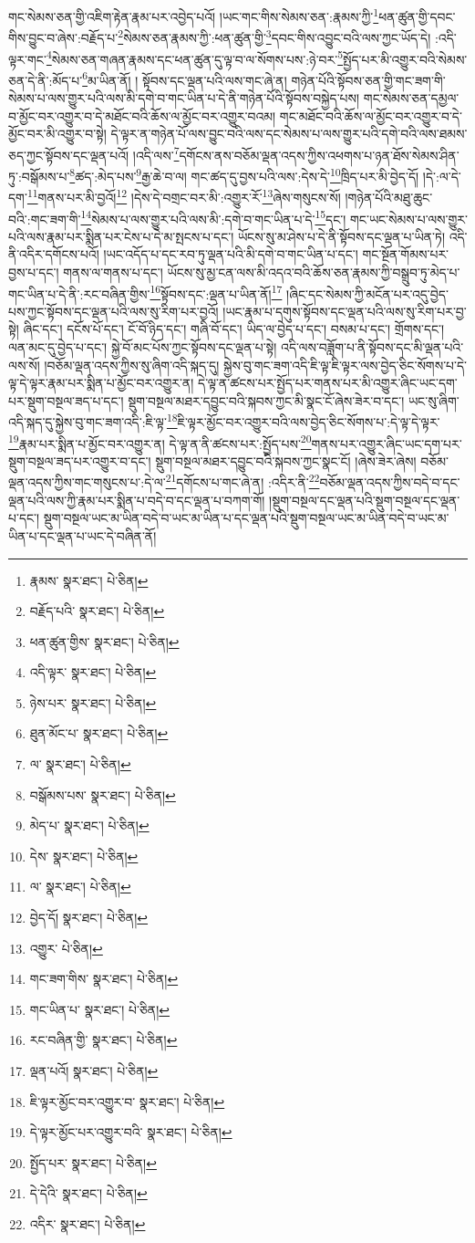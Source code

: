 གང་སེམས་ཅན་གྱི་འཇིག་རྟེན་རྣམ་པར་འབྱེད་པའོ། །ཡང་གང་གིས་སེམས་ཅན་:རྣམས་ཀྱི་\footnote{རྣམས་  སྣར་ཐང་།  པེ་ཅིན། }ཕན་ཚུན་གྱི་དབང་གིས་བྱུང་བ་ཞེས་:བརྗོད་པ་\footnote{བརྗོད་པའི་  སྣར་ཐང་།  པེ་ཅིན། }སེམས་ཅན་རྣམས་ཀྱི་:ཕན་ཚུན་གྱི་\footnote{ཕན་ཚུན་གྱིས་  སྣར་ཐང་།  པེ་ཅིན། }དབང་གིས་འབྱུང་བའི་ལས་ཀྱང་ཡོད་དེ། :འདི་ལྟར་གང་\footnote{འདི་ལྟར་  སྣར་ཐང་།  པེ་ཅིན། }སེམས་ཅན་གཞན་རྣམས་དང་ཕན་ཚུན་དུ་ལྟ་བ་ལ་སོགས་པས་:ཉེ་བར་\footnote{ཉེས་པར་  སྣར་ཐང་།  པེ་ཅིན། }སྤྱོད་པར་མི་འགྱུར་བའི་སེམས་ཅན་དེ་ནི་:མོད་པ་\footnote{ཐུན་མོང་པ་  སྣར་ཐང་།  པེ་ཅིན། }མ་ཡིན་ནོ། །
སྟོབས་དང་ལྡན་པའི་ལས་གང་ཞེ་ན། གཉེན་པོའི་སྟོབས་ཅན་གྱི་གང་ཟག་གི་སེམས་པ་ལས་གྱུར་པའི་ལས་མི་དགེ་བ་གང་ཡིན་པ་དེ་ནི་གཉེན་པོའི་སྟོབས་བསྐྱེད་པས། གང་སེམས་ཅན་དམྱལ་བ་མྱོང་བར་འགྱུར་བ་དེ་མཐོང་བའི་ཆོས་ལ་མྱོང་བར་འགྱུར་བའམ། གང་མཐོང་བའི་ཆོས་ལ་མྱོང་བར་འགྱུར་བ་དེ་མྱོང་བར་མི་འགྱུར་བ་སྟེ། དེ་ལྟར་ན་གཉེན་པོ་ལས་བྱུང་བའི་ལས་དང་སེམས་པ་ལས་གྱུར་པའི་དགེ་བའི་ལས་ཐམས་ཅད་ཀྱང་སྟོབས་དང་ལྡན་པའོ། །འདི་ལས་\footnote{ལ་  སྣར་ཐང་།  པེ་ཅིན། }དགོངས་ནས་བཅོམ་ལྡན་འདས་ཀྱིས་འཕགས་པ་ཉན་ཐོས་སེམས་ཤིན་ཏུ་:བསྒོམས་པ་\footnote{བསྒོམས་པས་  སྣར་ཐང་།  པེ་ཅིན། }ཚད་:མེད་པས་\footnote{མེད་པ་  སྣར་ཐང་།  པེ་ཅིན། }རྒྱ་ཆེ་བ་ལ། གང་ཚད་དུ་བྱས་པའི་ལས་:དེས་དེ་\footnote{དེས་  སྣར་ཐང་།  པེ་ཅིན། }ཁྲིད་པར་མི་བྱེད་དོ། །དེ་:ལ་དེ་དག་\footnote{ལ་  སྣར་ཐང་།  པེ་ཅིན། }གནས་པར་མི་བྱའོ།\footnote{བྱེད་དོ།  སྣར་ཐང་།  པེ་ཅིན། } །དེས་དེ་བགྲང་བར་མི་:འགྱུར་རོ་\footnote{འགྱུར་  པེ་ཅིན། }ཞེས་གསུངས་སོ། །གཉེན་པོའི་མཐུ་ཆུང་བའི་:གང་ཟག་གི་\footnote{གང་ཟག་གིས་  སྣར་ཐང་།  པེ་ཅིན། }སེམས་པ་ལས་གྱུར་པའི་ལས་མི་:དགེ་བ་གང་ཡིན་པ་དེ་\footnote{གང་ཡིན་པ་  སྣར་ཐང་།  པེ་ཅིན། }དང་། གང་ཡང་སེམས་པ་ལས་གྱུར་པའི་ལས་རྣམ་པར་སྨིན་པར་ངེས་པ་དེ་མ་སྤངས་པ་དང་། ཡོངས་སུ་མ་ཤེས་པ་དེ་ནི་སྟོབས་དང་ལྡན་པ་ཡིན་ཏེ། འདི་ནི་འདིར་དགོངས་པའོ། །ཡང་འདོད་པ་དང་རབ་ཏུ་ལྡན་པའི་མི་དགེ་བ་གང་ཡིན་པ་དང་། གང་སྔོན་གོམས་པར་བྱས་པ་དང་། གནས་ལ་གནས་པ་དང་། ཡོངས་སུ་མྱ་ངན་ལས་མི་འདའ་བའི་ཆོས་ཅན་རྣམས་ཀྱི་བསྒྲུབ་ཏུ་མེད་པ་གང་ཡིན་པ་དེ་ནི་:རང་བཞིན་གྱིས་\footnote{རང་བཞིན་གྱི་  སྣར་ཐང་།  པེ་ཅིན། }སྟོབས་དང་:ལྡན་པ་ཡིན་ནོ།\footnote{ལྡན་པའོ།  སྣར་ཐང་།  པེ་ཅིན། } །ཞིང་དང་སེམས་ཀྱི་མངོན་པར་འདུ་བྱེད་པས་ཀྱང་སྟོབས་དང་ལྡན་པའི་ལས་སུ་རིག་པར་བྱའོ། །ཡང་རྣམ་པ་དགུས་སྟོབས་དང་ལྡན་པའི་ལས་སུ་རིག་པར་བྱ་སྟེ། ཞིང་དང་། དངོས་པོ་དང་། ངོ་བོ་ཉིད་དང་། གཞི་བོ་དང་། ཡིད་ལ་བྱེད་པ་དང་། བསམ་པ་དང་། གྲོགས་དང་། ལན་མང་དུ་བྱེད་པ་དང་། སྐྱེ་བོ་མང་པོས་ཀྱང་སྟོབས་དང་ལྡན་པ་སྟེ། འདི་ལས་བཟློག་པ་ནི་སྟོབས་དང་མི་ལྡན་པའི་ལས་སོ། །བཅོམ་ལྡན་འདས་ཀྱིས་སུ་ཞིག་འདི་སྐད་དུ། སྐྱེས་བུ་གང་ཟག་འདི་ཇི་ལྟ་ཇི་ལྟར་ལས་བྱེད་ཅིང་སོགས་པ་དེ་ལྟ་དེ་ལྟར་རྣམ་པར་སྨིན་པ་མྱོང་བར་འགྱུར་ན། དེ་ལྟ་ན་ཚངས་པར་སྤྱོད་པར་གནས་པར་མི་འགྱུར་ཞིང་ཡང་དག་པར་སྡུག་བསྔལ་ཟད་པ་དང་། སྡུག་བསྔལ་མཐར་དབྱུང་བའི་སྐབས་ཀྱང་མི་སྣང་ངོ་ཞེས་ཟེར་བ་དང་། ཡང་སུ་ཞིག་འདི་སྐད་དུ་སྐྱེས་བུ་གང་ཟག་འདི་:ཇི་ལྟ་\footnote{ཇི་ལྟར་མྱོང་བར་འགྱུར་བ་  སྣར་ཐང་།  པེ་ཅིན། }ཇི་ལྟར་མྱོང་བར་འགྱུར་བའི་ལས་བྱེད་ཅིང་སོགས་པ་:དེ་ལྟ་དེ་ལྟར་\footnote{དེ་ལྟར་མྱོང་པར་འགྱུར་བའི་  སྣར་ཐང་།  པེ་ཅིན། }རྣམ་པར་སྨིན་པ་མྱོང་བར་འགྱུར་ན། དེ་ལྟ་ན་ནི་ཚངས་པར་:སྤྱོད་པས་\footnote{སྤྱོད་པར་  སྣར་ཐང་།  པེ་ཅིན། }གནས་པར་འགྱུར་ཞིང་ཡང་དག་པར་སྡུག་བསྔལ་ཟད་པར་འགྱུར་བ་དང་། སྡུག་བསྔལ་མཐར་དབྱུང་བའི་སྐབས་ཀྱང་སྣང་ངོ། །ཞེས་ཟེར་ཞེས། བཅོམ་ལྡན་འདས་ཀྱིས་གང་གསུངས་པ་:དེ་ལ་\footnote{དེ་དེའི་  སྣར་ཐང་།  པེ་ཅིན། }དགོངས་པ་གང་ཞེ་ན། :འདིར་ནི་\footnote{འདིར་  སྣར་ཐང་།  པེ་ཅིན། }བཅོམ་ལྡན་འདས་ཀྱིས་བདེ་བ་དང་ལྡན་པའི་ལས་ཀྱི་རྣམ་པར་སྨིན་པ་བདེ་བ་དང་ལྡན་པ་བཀག་གོ། །སྡུག་བསྔལ་དང་ལྡན་པའི་སྡུག་བསྔལ་དང་ལྡན་པ་དང་། སྡུག་བསྔལ་ཡང་མ་ཡིན་བདེ་བ་ཡང་མ་ཡིན་པ་དང་ལྡན་པའི་སྡུག་བསྔལ་ཡང་མ་ཡིན་བདེ་བ་ཡང་མ་ཡིན་པ་དང་ལྡན་པ་ཡང་དེ་བཞིན་ནོ། 
